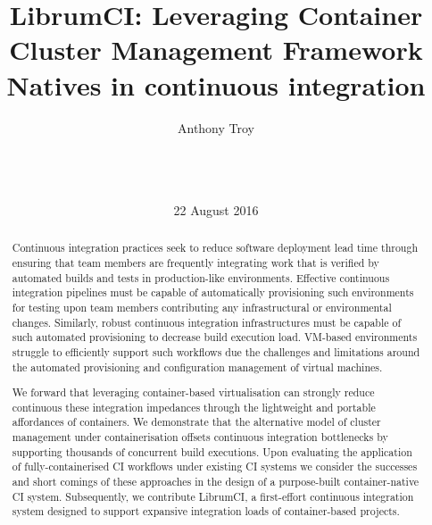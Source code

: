 \documentclass{report}
\begin{document}
\title{LibrumCI: Leveraging Container Cluster Management Framework Natives in continuous integration}

\author{
\alignauthor
Anthony Troy\\
       \\
       \\
       \\
}

\date{22 August 2016}

\maketitle

\begin{abstract}
Continuous integration practices seek to reduce software deployment lead time
through ensuring that team members are frequently integrating work that is 
verified by automated builds and tests in production-like environments. 
Effective continuous integration pipelines must be capable of automatically
provisioning such environments for testing upon team members contributing any
infrastructural or environmental changes. Similarly,
robust continuous integration infrastructures must be capable of such
automated provisioning to decrease build execution load. VM-based environments
struggle to efficiently support such workflows due the challenges and limitations 
around the automated provisioning and configuration management of virtual machines.
\par
We forward that leveraging container-based virtualisation can strongly reduce
continuous these integration impedances through the lightweight and portable affordances of containers. We demonstrate
that the alternative model of cluster management under containerisation offsets continuous
integration bottlenecks by supporting thousands of concurrent build executions.
Upon evaluating the application of fully-containerised CI workflows under existing CI systems 
we consider the successes and short comings of these approaches in the design of a purpose-built container-native
CI system. Subsequently, we contribute LibrumCI, a first-effort continuous integration system designed 
to support expansive integration loads of container-based projects. 

\end{abstract}
\end{document}
